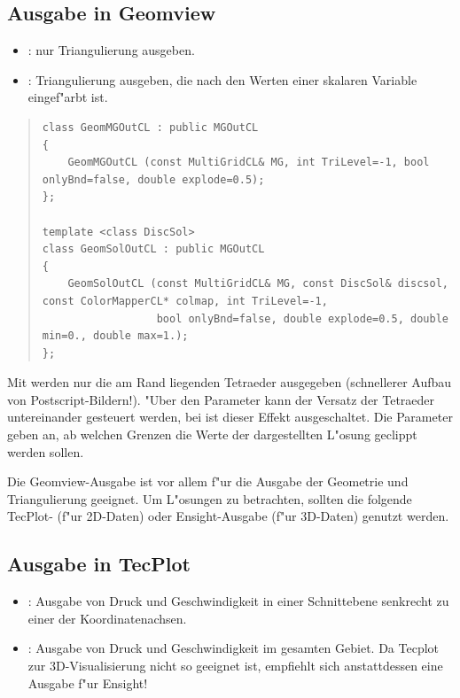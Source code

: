 \documentclass[11pt,a4paper]{article}
\newenvironment{Code}{\begin{quote}\scriptsize}{\end{quote}}
\begin{document}
\subsection{Ausgabe in Geomview}
\begin{itemize}
    \item {}: nur Triangulierung ausgeben.
    \item {}: Triangulierung ausgeben, die nach den Werten 
    einer skalaren Variable eingef"arbt ist.
\end{itemize}

\begin{Code}
\begin{verbatim}
class GeomMGOutCL : public MGOutCL
{
    GeomMGOutCL (const MultiGridCL& MG, int TriLevel=-1, bool onlyBnd=false, double explode=0.5);
};

template <class DiscSol>
class GeomSolOutCL : public MGOutCL
{
    GeomSolOutCL (const MultiGridCL& MG, const DiscSol& discsol, const ColorMapperCL* colmap, int TriLevel=-1, 
                  bool onlyBnd=false, double explode=0.5, double min=0., double max=1.);
};
\end{verbatim}
\end{Code}

Mit  werden nur die am Rand liegenden Tetraeder ausgegeben
(schnellerer Aufbau von Postscript-Bildern!). "Uber den Parameter 
kann der Versatz der Tetraeder untereinander gesteuert werden, bei
 ist dieser Effekt ausgeschaltet. Die Parameter 
geben an, ab welchen Grenzen die Werte der dargestellten L"osung geclippt
werden sollen.

Die Geomview-Ausgabe ist vor allem f"ur die Ausgabe der Geometrie und
Triangulierung geeignet. Um L"osungen zu betrachten, sollten die folgende
TecPlot- (f"ur 2D-Daten) oder Ensight-Ausgabe (f"ur 3D-Daten) genutzt werden.

\subsection{Ausgabe in TecPlot}
\begin{itemize}
    \item {}: Ausgabe von Druck und Geschwindigkeit 
    in einer Schnittebene senkrecht zu einer der Koordinatenachsen.
    \item {}: Ausgabe von Druck und Geschwindigkeit im gesamten
    Gebiet. Da Tecplot zur 3D-Visualisierung nicht so geeignet ist, empfiehlt
    sich anstattdessen eine Ausgabe f"ur Ensight!
\end{itemize}
\end{document}
